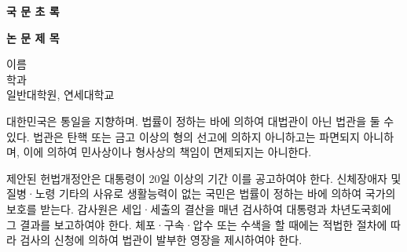 \clearpage
\begin{flushleft}
    \Large{
        \textbf{국 문 초 록}\\
    }
\vspace{\baselineskip}
\end{flushleft}

\begin{centering}
    \LARGE{
        \textbf{논 문 제 목} \\
    }
\vspace{\baselineskip}
\end{centering}


\begin{flushright}
    이름 \\
    학과 \\
    일반대학원, 연세대학교
\end{flushright}

대한민국은 통일을 지향하며. 법률이 정하는 바에 의하여 대법관이 아닌 법관을 둘 수 있다. 법관은 탄핵 또는 금고 이상의 형의 선고에 의하지 아니하고는 파면되지 아니하며, 이에 의하여 민사상이나 형사상의 책임이 면제되지는 아니한다.

제안된 헌법개정안은 대통령이 20일 이상의 기간 이를 공고하여야 한다. 신체장애자 및 질병·노령 기타의 사유로 생활능력이 없는 국민은 법률이 정하는 바에 의하여 국가의 보호를 받는다. 감사원은 세입·세출의 결산을 매년 검사하여 대통령과 차년도국회에 그 결과를 보고하여야 한다. 체포·구속·압수 또는 수색을 할 때에는 적법한 절차에 따라 검사의 신청에 의하여 법관이 발부한 영장을 제시하여야 한다.

